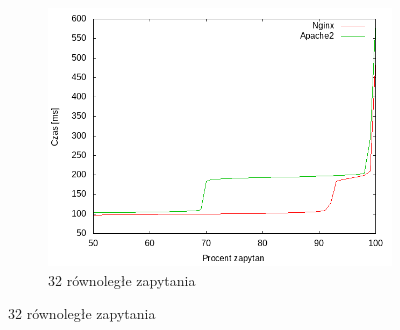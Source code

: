 \begin{figure}
\begin{subfigure}[h]{0.3\textwidth}
		\includegraphics[width=\textwidth]{testy/wybor_fib_5_32.png}
		\caption{32 równoległe zapytania}
	\end{subfigure}


\end{figure}
